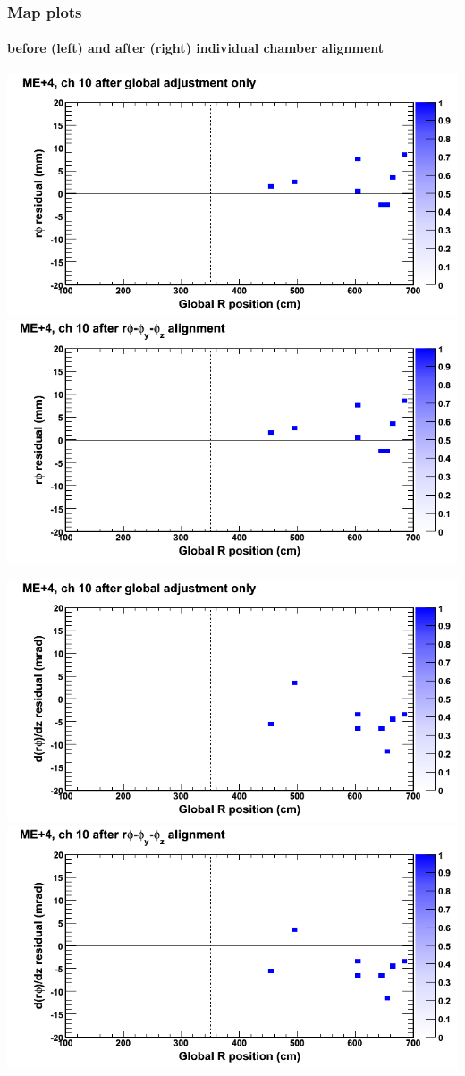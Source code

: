 \documentclass[compress]{beamer}
\begin{document}
\begin{frame}
\frametitle{Map plots}
\framesubtitle{before (left) and after (right) individual chamber alignment}
\includegraphics[width=0.5\linewidth]{ringmapplots_3dof/before_CSCvsr_mep4ch10_x.png} \includegraphics[width=0.5\linewidth]{ringmapplots_3dof/after_CSCvsr_mep4ch10_x.png}

\includegraphics[width=0.5\linewidth]{ringmapplots_3dof/before_CSCvsr_mep4ch10_dxdz.png} \includegraphics[width=0.5\linewidth]{ringmapplots_3dof/after_CSCvsr_mep4ch10_dxdz.png}
\end{frame}
\end{document}

